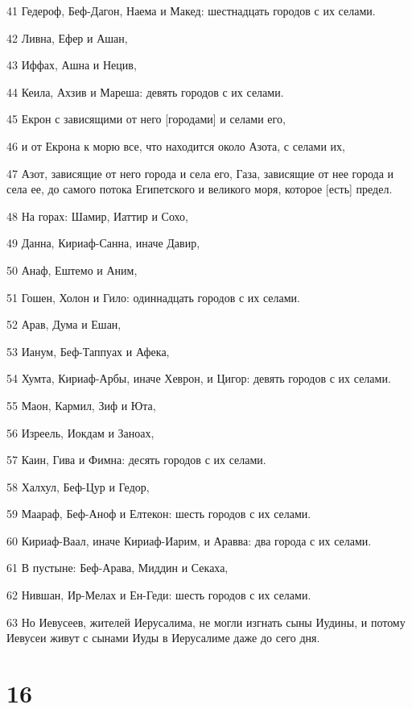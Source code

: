 \par 41 Гедероф, Беф-Дагон, Наема и Макед: шестнадцать городов с их селами.
\par 42 Ливна, Ефер и Ашан,
\par 43 Иффах, Ашна и Нецив,
\par 44 Кеила, Ахзив и Мареша: девять городов с их селами.
\par 45 Екрон с зависящими от него [городами] и селами его,
\par 46 и от Екрона к морю все, что находится около Азота, с селами их,
\par 47 Азот, зависящие от него города и села его, Газа, зависящие от нее города и села ее, до самого потока Египетского и великого моря, которое [есть] предел.
\par 48 На горах: Шамир, Иаттир и Сохо,
\par 49 Данна, Кириаф-Санна, иначе Давир,
\par 50 Анаф, Ештемо и Аним,
\par 51 Гошен, Холон и Гило: одиннадцать городов с их селами.
\par 52 Арав, Дума и Ешан,
\par 53 Ианум, Беф-Таппуах и Афека,
\par 54 Хумта, Кириаф-Арбы, иначе Хеврон, и Цигор: девять городов с их селами.
\par 55 Маон, Кармил, Зиф и Юта,
\par 56 Изреель, Иокдам и Заноах,
\par 57 Каин, Гива и Фимна: десять городов с их селами.
\par 58 Халхул, Беф-Цур и Гедор,
\par 59 Маараф, Беф-Аноф и Елтекон: шесть городов с их селами.
\par 60 Кириаф-Ваал, иначе Кириаф-Иарим, и Аравва: два города с их селами.
\par 61 В пустыне: Беф-Арава, Миддин и Секаха,
\par 62 Нившан, Ир-Мелах и Ен-Геди: шесть городов с их селами.
\par 63 Но Иевусеев, жителей Иерусалима, не могли изгнать сыны Иудины, и потому Иевусеи живут с сынами Иуды в Иерусалиме даже до сего дня.

\chapter{16}

